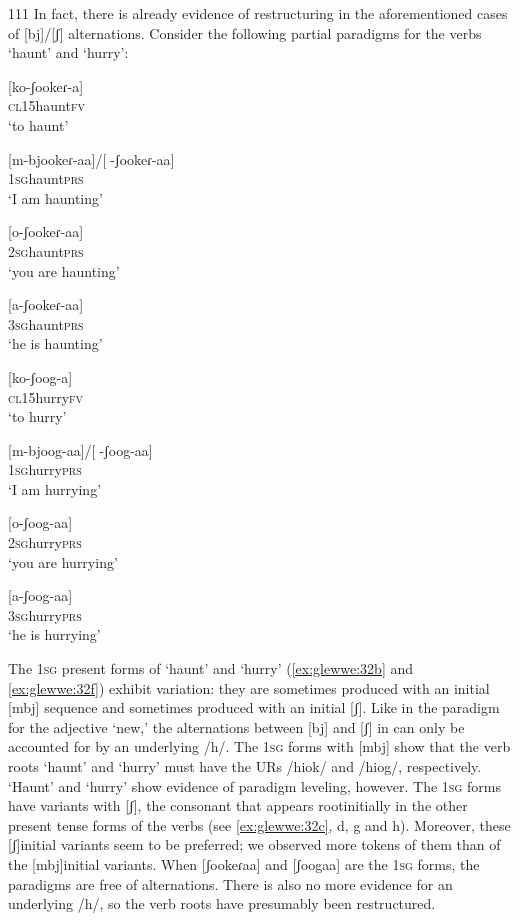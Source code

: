 \documentclass[output=paper]{langsci/langscibook}
\begin{document}
\begin{tabular}{111}
In fact, there is already evidence of restructuring in the aforementioned cases of [bj]/[ʃ] alternations. Consider the following partial paradigms for the verbs ‘haunt’ and ‘hurry’:



\ea{}
 [ko-ʃookeɾ-a]\\{}
\textsc{cl15}haunt\textsc{fv}\\{}
\glt ‘to haunt’
\z


\ea{}
 [m-bjookeɾ-aa]/[-ʃookeɾ-aa]\\{}
\textsc{1sg}haunt\textsc{prs}\\{}
\glt ‘I am haunting’
\z


\ea{}
 [o-ʃookeɾ-aa]\\{}
\textsc{2sg}haunt\textsc{prs}\\{}
\glt ‘you are haunting’
\z


\ea{}
 [a-ʃookeɾ-aa]\\{}
\textsc{3sg}haunt\textsc{prs}\\{}
\glt ‘he is haunting’
\z


\ea{}
 [ko-ʃoog-a]\\{}
\textsc{cl15}hurry\textsc{fv}\\{}
\glt ‘to hurry’
\z


\ea{}
 [m-bjoog-aa]/[-ʃoog-aa]\\{}
\textsc{1sg}hurry\textsc{prs}\\{}
\glt ‘I am hurrying’
\z


\ea{}
 [o-ʃoog-aa]\\{}
\textsc{2sg}hurry\textsc{prs}\\{}
\glt ‘you are hurrying’
\z


\ea{}
 [a-ʃoog-aa]\\{}
\textsc{3sg}hurry\textsc{prs}\\{}
\glt ‘he is hurrying’
\z

The 1\textsc{sg} present forms of ‘haunt’ and ‘hurry’ (\ref{ex:glewwe:32b} and \ref{ex:glewwe:32f}) exhibit variation: they are sometimes produced with an initial [mbj] sequence and sometimes produced with an initial [ʃ]. Like in the paradigm for the adjective ‘new,’ the alternations between [bj] and [ʃ] in  can only be accounted for by an underlying /h/. The 1\textsc{sg} forms with [mbj] show that the verb roots ‘haunt’ and ‘hurry’ must have the URs /hiok/ and /hiog/, respectively. ‘Haunt’ and ‘hurry’ show evidence of paradigm leveling, however. The 1\textsc{sg} forms have variants with [ʃ], the consonant that appears rootinitially in the other present tense forms of the verbs (see \ref{ex:glewwe:32c}, d, g and h). Moreover, these [ʃ]initial variants seem to be preferred; we observed more tokens of them than of the [mbj]initial variants. When [ʃookeɾaa] and [ʃoogaa] are the 1\textsc{sg} forms, the paradigms are free of alternations. There is also no more evidence for an underlying /h/, so the verb roots have presumably been restructured. 


\end{tabular}
\end{document}
